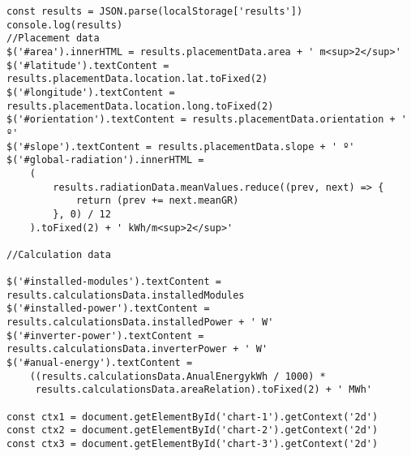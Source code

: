 \begin{lstlisting}[style=ES6, caption={public/renderResults.js}]
const results = JSON.parse(localStorage['results'])
console.log(results)
//Placement data
$('#area').innerHTML = results.placementData.area + ' m<sup>2</sup>'
$('#latitude').textContent = results.placementData.location.lat.toFixed(2)
$('#longitude').textContent = results.placementData.location.long.toFixed(2)
$('#orientation').textContent = results.placementData.orientation + ' º'
$('#slope').textContent = results.placementData.slope + ' º'
$('#global-radiation').innerHTML =
	(
		results.radiationData.meanValues.reduce((prev, next) => {
			return (prev += next.meanGR)
		}, 0) / 12
	).toFixed(2) + ' kWh/m<sup>2</sup>'

//Calculation data

$('#installed-modules').textContent = results.calculationsData.installedModules
$('#installed-power').textContent = results.calculationsData.installedPower + ' W'
$('#inverter-power').textContent = results.calculationsData.inverterPower + ' W'
$('#anual-energy').textContent =
	((results.calculationsData.AnualEnergykWh / 1000) *
	 results.calculationsData.areaRelation).toFixed(2) + ' MWh'

const ctx1 = document.getElementById('chart-1').getContext('2d')
const ctx2 = document.getElementById('chart-2').getContext('2d')
const ctx3 = document.getElementById('chart-3').getContext('2d')


\end{lstlisting}
